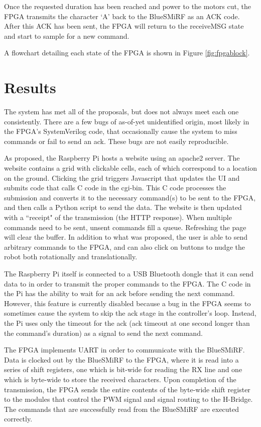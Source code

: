 \documentclass[12pt]{article}
\begin{document}
Once the requested duration has been reached and power to the motors cut, the FPGA transmits the character `A' back to the BlueSMiRF as an ACK code.  After this ACK has been sent, the FPGA will return to the receiveMSG state and start to sample for a new command.

A flowchart detailing each state of the FPGA is shown in Figure \ref{fig:fpgablock}.



\section{Results}

The system has met all of the proposals, but does not always meet each one consistently.  There are a few bugs of as-of-yet unidentified origin, most likely in the FPGA's SystemVerilog code, that occasionally cause the system to miss commands or fail to send an ack.  These bugs are not easily reproducible.

As proposed, the Raspberry Pi hosts a website using an apache2 server.  The website contains a grid with clickable cells, each of which correspond to a location on the ground. Clicking the grid triggers Javascript that updates the UI and submits code that calls C code in the cgi-bin.  This C code processes the submission and converts it to the necessary command(s) to be sent to the FPGA, and then calls a Python script to send the data.  The website is then updated with a ``receipt" of the transmission (the HTTP response).  When multiple commands need to be sent, unsent commands fill a queue.  Refreshing the page will clear the buffer.  In addition to what was proposed, the user is able to send arbitrary commands to the FPGA, and can also click on buttons to nudge the robot both rotationally and translationally.

The Raspberry Pi itself is connected to a USB Bluetooth dongle that it can send data to in order to transmit the proper commands to the FPGA.  The C code in the Pi has the ability to wait for an ack before sending the next command.  However, this feature is currently disabled because a bug in the FPGA seems to sometimes cause the system to skip the ack stage in the controller's loop.  Instead, the Pi uses only the timeout for the ack (ack timeout at one second longer than the command's duration) as a signal to send the next command.

The FPGA implements UART in order to communicate with the BlueSMiRF.  Data is clocked out by the BlueSMiRF to the FPGA, where it is read into a series of shift registers, one which is bit-wide for reading the RX line and one which is byte-wide to store the received characters.  Upon completion of the transmission, the FPGA sends the entire contents of the byte-wide shift register to the modules that control the PWM signal and signal routing to the H-Bridge.  The commands that are successfully read from the BlueSMiRF are executed correctly.
\end{document}
